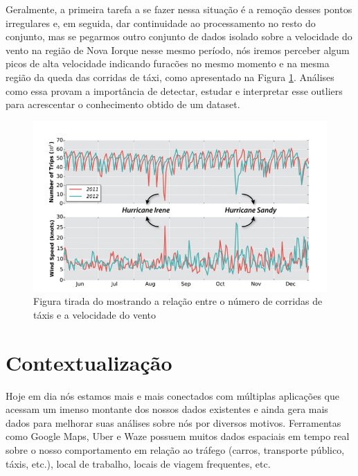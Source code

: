 Geralmente, a primeira tarefa a se fazer nessa situação é a remoção desses pontos irregulares e, em seguida, dar continuidade ao processamento no resto do conjunto, mas se pegarmos outro conjunto de dados isolado sobre a velocidade do vento na região de Nova Iorque nesse mesmo período, nós iremos perceber algum picos de alta velocidade indicando furacões no mesmo momento e na mesma região da queda das corridas de táxi, como apresentado na Figura \ref{fig:freire-paper-taxi-wind}. Análises como essa provam a importância de detectar, estudar e interpretar esse outliers para acrescentar o conhecimento obtido de um dataset.

\begin{figure}[t]
	\centering
	\includegraphics[width=\textwidth]{images/outlier-freire-figure-1}
	\caption{Figura tirada do \cite{DBLP:journals/debu/FreireCVZ16} mostrando a relação entre o número de corridas de táxis e a velocidade do vento}
	\label{fig:freire-paper-taxi-wind}
	\vspace{-10pt}
\end{figure}

\section{Contextualização}

Hoje em dia nós estamos mais e mais conectados com múltiplas aplicações que acessam um imenso montante dos nossos dados existentes e ainda gera mais dados para melhorar suas análises sobre nós por diversos motivos. Ferramentas como Google Maps, Uber e Waze possuem muitos dados espaciais em tempo real sobre o nosso comportamento em relação ao tráfego (carros, transporte público, táxis, etc.), local de trabalho, locais de viagem frequentes, etc.


